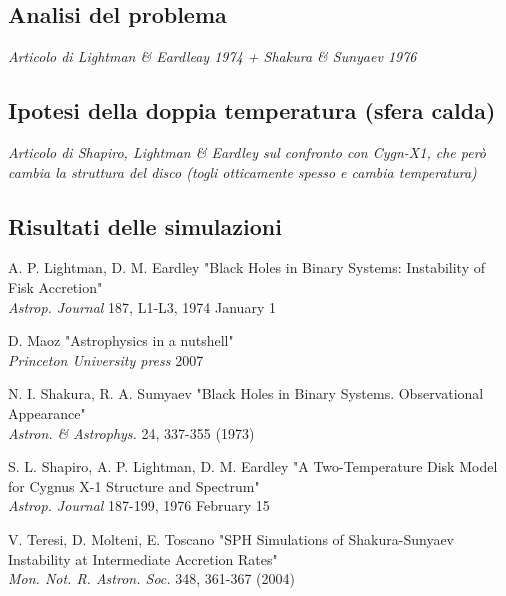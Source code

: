 \documentclass[a4paper]{article}
\begin{document}
	\subsection{Analisi del problema}

		\emph{Articolo di Lightman \& Eardleay 1974 + Shakura \& Sunyaev 1976}

	\subsection{Ipotesi della doppia temperatura (sfera calda)}

		 \emph{Articolo di Shapiro, Lightman \& Eardley sul confronto con Cygn-X1, che però cambia la struttura del disco (togli otticamente spesso e cambia temperatura)}\\
	
	\subsection{Risultati delle simulazioni}

\newpage
\begin{thebibliography}{9}
	A. P. Lightman, D. M. Eardley 
	"Black Holes in Binary Systems: Instability of Fisk Accretion"\\
	\textit{Astrop. Journal} 187, L1-L3, 1974 January 1
	
	D. Maoz 
	"Astrophysics in a nutshell"\\
	\textit{Princeton University press} 2007
	
	N. I. Shakura, R. A. Sumyaev 
	"Black Holes in Binary Systems. Observational Appearance"\\
	\textit{Astron. \& Astrophys.} 24, 337-355 (1973)

	S. L. Shapiro, A. P. Lightman, D. M. Eardley 
	"A Two-Temperature Disk Model for Cygnus X-1 Structure and Spectrum"\\
	\textit{Astrop. Journal} 187-199, 1976 February 15

	
	V. Teresi, D. Molteni, E. Toscano 
	"SPH Simulations of Shakura-Sunyaev Instability at Intermediate Accretion Rates"\\
	\textit{Mon. Not. R. Astron. Soc.} 348, 361-367 (2004)
\end{thebibliography}
\end{document}
